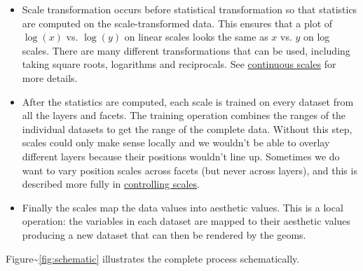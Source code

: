 \begin{itemize}
\item
  Scale transformation occurs before statistical transformation so that
  statistics are computed on the scale-transformed data. This ensures
  that a plot of \(\log(x)\) vs. \(\log(y)\) on linear scales looks the
  same as \(x\) vs. \(y\) on log scales. There are many different
  transformations that can be used, including taking square roots,
  logarithms and reciprocals. See
  \hyperref[ssub:scale-continuous]{continuous scales} for more details.
\item
  After the statistics are computed, each scale is trained on every
  dataset from all the layers and facets. The training operation
  combines the ranges of the individual datasets to get the range of the
  complete data. Without this step, scales could only make sense locally
  and we wouldn't be able to overlay different layers because their
  positions wouldn't line up. Sometimes we do want to vary position
  scales across facets (but never across layers), and this is described
  more fully in \hyperref[sub:controlling-scales]{controlling scales}.
\item
  Finally the scales map the data values into aesthetic values. This is
  a local operation: the variables in each dataset are mapped to their
  aesthetic values producing a new dataset that can then be rendered by
  the geoms.
\end{itemize}

Figure\textasciitilde{}\ref{fig:schematic} illustrates the complete
process schematically.

